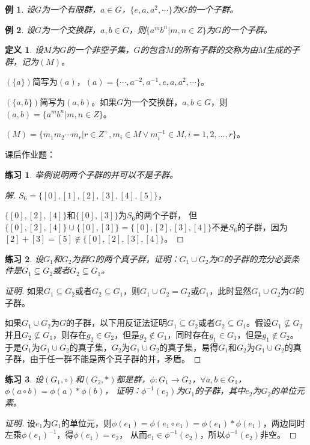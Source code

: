 \documentclass{article}
\newtheorem{Def}{定义}
\newtheorem{Exercise}{练习}
\newtheorem*{Example}{例}
\begin{document}
\begin{CJK*}{UTF8}{gbsn}
  \begin{Example}
    设$G$为一个有限群，$a\in G$，$\{e,a,a^2,\cdots\}$为$G$的一个子群。
  \end{Example}
  
  \begin{Example}
    设$G$为一个交换群，$a,b\in G$，则$\{a^mb^n|m,n\in Z\}$为$G$的一个子群。
  \end{Example}
  
  \begin{Def}
    设$M$为$G$的一个非空子集，$G$的包含$M$的所有子群的交称为由$M$生成的子群，记为$(M)$。
  \end{Def}
  
  $(\{a\})$简写为$(a)$，$(a)=\{\cdots,a^{-2},a^{-1},e,a,a^2,\cdots\}$。
  
  $(\{a,b\})$简写为$(a,b)$。如果$G$为一个交换群，$a,b\in G$，则$(a,b)=\{a^mb^n|m,n\in Z\}$。
  
  $(M)=\{m_1m_2\cdots m_r|r\in Z^+,m_i\in M \lor m_i^{-1}\in M,i=1,2,\ldots,r\}$。
    


课后作业题：
\begin{Exercise}
举例说明两个子群的并可以不是子群。
\end{Exercise}
\begin{proof}[解]
  $S_6=\{[0],[1],[2],[3],[4],[5]\}$，

  $\{[0],[2],[4]\}$和$\{[0],[3]\}$为$S_6$的两个子群，
  但$\{[0],[2],[4]\}\cup \{[0],[3]\}=\{[0],[2],[3],[4]\}$不是$S_6$的子群，因为$[2]+[3]=[5]\notin \{[0],[2],[3],[4]\}$。
\end{proof}
\begin{Exercise}
  设$G_1$和$G_2$为群$G$的两个真子群，证明：$G_1\cup G_2$为$G$的子群的充分必要条件是$G_1\subseteq G_2$或者$G_2\subseteq G_1$。
\end{Exercise}
\begin{proof}[证明]
  如果$G_1\subseteq G_2$或者$G_2\subseteq G_1$，则$G_1\cup G_2=G_2$或$G_1$，此时显然$G_1\cup G_2$为$G$的子群。

  如果$G_1\cup G_2$为$G$的子群，以下用反证法证明$G_1\subseteq G_2$或者$G_2\subseteq G_1$。假设$G_1\nsubseteq G_2$并且$G_2\nsubseteq G_1$，则存在$g_2\in G_2$，但是$g_2\notin G_1$，同时存在$g_1\in G_1$，但是$g_1\notin G_2$。
  于是$G_1$为$G_1\cup G_2$的真子集，$G_2$为$G_1\cup G_2$的真子集，易得$G_1$和$G_2$为$G_1\cup G_2$的真子群，由于任一群不能是两个真子群的并，矛盾。
\end{proof}
\begin{Exercise}
  设$(G_1,\circ)$和$(G_2,*)$都是群，$\phi:G_1\to G_2$，$\forall a,b\in G_1$，$\phi(a\circ b)=\phi(a)*\phi(b)$，
  证明：$\phi^{-1}(e_2)$为$G_1$的子群，其中$e_2$为$G_2$的单位元素。
\end{Exercise}
\begin{proof}[证明]
  设$e_1$为$G_1$的单位元，则$\phi(e_1)=\phi(e_1\circ e_1)=\phi(e_1)*\phi(e_1)$，两边同时左乘$\phi(e_1)^{-1}$，得$\phi(e_1)=e_2$，
  从而$e_1\in \phi^{-1}(e_2)$，所以$\phi^{-1}(e_2)$非空。


\end{proof}
\end{CJK*}
\end{document}
